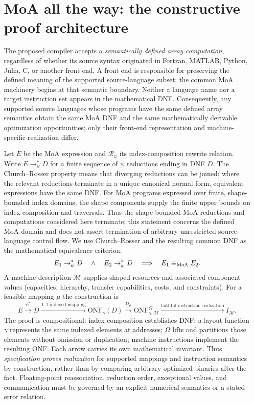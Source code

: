 \documentclass[11pt]{article}
\begin{document}
\section{MoA all the way: the constructive proof architecture}
\label{sec:constructive}
The proposed compiler accepts a \emph{semantically defined array computation}, regardless of whether its source syntax originated in Fortran, MATLAB, Python, Julia, C, or another front end. A front end is responsible for preserving the defined meaning of the supported source-language subset; the common MoA machinery begins at that semantic boundary. Neither a language name nor a target instruction set appears in the mathematical DNF. Consequently, any supported source languages whose programs have the same defined array semantics obtain the same MoA DNF and the same mathematically derivable optimization opportunities; only their front-end representation and machine-specific realization differ.

Let $E$ be the MoA expression and $\mathcal R_\psi$ its index-composition rewrite relation. Write $E\rightarrow_\psi^*D$ for a finite sequence of $\psi$ reductions ending in DNF $D$. The Church--Rosser property means that diverging reductions can be joined; where the relevant reductions terminate in a unique canonical normal form, equivalent expressions have the same DNF. For MoA programs expressed over finite, shape-bounded index domains, the shape components supply the finite upper bounds on index composition and traversals. Thus the shape-bounded MoA reductions and computations considered here terminate; this statement concerns the defined MoA domain and does not assert termination of arbitrary unrestricted source-language control flow. We use Church--Rosser and the resulting common DNF as the mathematical equivalence criterion.
\begin{equation}
E_1\rightarrow_\psi^*D\quad\land\quad E_2\rightarrow_\psi^*D
\quad\Longrightarrow\quad E_1\equiv_{\rm MoA}E_2.
\label{eq:common-dnf}
\end{equation}
A machine description $\mathcal M$ supplies shaped resources and associated component values (capacities, hierarchy, transfer capabilities, costs, and constraints). For a feasible mapping $\mu$ the construction is
\begin{equation}
E\xrightarrow{\psi^*}D\xrightarrow{\text{1--1 indexed mapping}}\mathrm{ONF}_\gamma(D)
\xrightarrow{\Omega_\mu}\mathrm{ONF}_{\gamma,\mathcal M}^{\Omega}
\xrightarrow{\text{faithful instruction realization}}I_{\mathcal M}.
\label{eq:constructive}
\end{equation}
The proof is compositional: index composition establishes DNF; a layout function $\gamma$ represents the same indexed elements at addresses; $\Omega$ lifts and partitions those elements without omission or duplication; machine instructions implement the resulting ONF. Each arrow carries its own mathematical invariant. Thus \emph{specification proves realization} for supported mappings and instruction semantics by construction, rather than by comparing arbitrary optimized binaries after the fact. Floating-point reassociation, reduction order, exceptional values, and communication must be governed by an explicit numerical semantics or a stated error relation.
\end{document}
